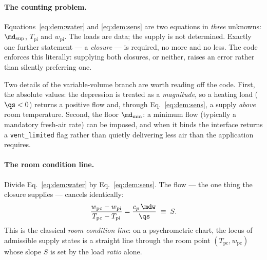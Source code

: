 \paragraph{The counting problem.} Equations~\eqref{eq:dem:water} and
\eqref{eq:dem:sens} are two equations in \emph{three} unknowns:
$\md_{\mathrm{sup}}$, $T_{\mathrm{pi}}$ and $w_{\mathrm{pi}}$. The loads are
data; the supply is not determined. Exactly one further statement --- a
\emph{closure} --- is required, no more and no less. The code enforces this
literally: supplying both closures, or neither, raises an error rather than
silently preferring one.

\begin{center}
\end{center}

Two details of the variable-volume branch are worth reading off the code. First,
the absolute values: the depression is treated as a \emph{magnitude}, so a
heating load ($\qs<0$) returns a positive flow and, through
Eq.~\eqref{eq:dem:sens}, a supply \emph{above} room temperature. Second, the
floor $\md_{\min}$: a minimum flow (typically a mandatory fresh-air rate) can be
imposed, and when it binds the interface returns a \verb|vent_limited| flag
rather than quietly delivering less air than the application requires.

\paragraph{The room condition line.} Divide Eq.~\eqref{eq:dem:water} by
Eq.~\eqref{eq:dem:sens}. The flow --- the one thing the closure supplies ---
cancels identically:
\begin{equation}
\frac{w_{\mathrm{pc}}-w_{\mathrm{pi}}}{T_{\mathrm{pc}}-T_{\mathrm{pi}}}
=\frac{c_p\,\mdw}{\qs}\;\equiv\;S .
\label{eq:dem:rcl}
\end{equation}
This is the classical \emph{room condition line}: on a psychrometric chart, the
locus of admissible supply states is a straight line through the room point
$(T_{\mathrm{pc}},w_{\mathrm{pc}})$ whose slope $S$ is set by the load
\emph{ratio} alone.

